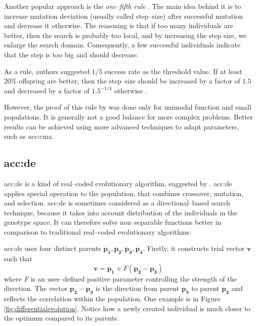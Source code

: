 Another popular approach is the \emph{one--fifth rule} \citep{onefifthrule}. The main idea behind it is to increase mutation deviation (usually called step--size) after successful mutation and decrease it otherwise. The reasoning is that if too many individuals are better, then the search is probably too local, and by increasing the step size, we enlarge the search domain. Consequently, a few successful individuals indicate that the step is too big and should decrease.

As a rule, authors \citet*{onefifthruleoriginal} suggested $1/5$ success rate as the threshold value. If at least $20\%$ offspring are better, then the step--size should be increased by a factor of $1.5$ and decreased by a factor of $1.5^{-1/4}$ otherwise \citep{onefifthrule}.

However, the proof of this rule by \citeauthor*{onefifthruleoriginal} was done only for unimodal function and small populations. It is generally not a good balance for more complex problems. Better results can be achieved using more advanced techniques to adapt parameters, such as \acrshort{acc:cma}.

\subsection{\texorpdfstring{\acrlong*{acc:de}}{Differential Evolution}}

\acrfull{acc:de} is a kind of real--coded evolutionary algorithm, suggested by \citet*{differentialevolutionoriginal}. \acrshort{acc:de} applies special operation to the population, that combines crossover, mutation, and selection. \acrshort{acc:de} is sometimes considered as a directional--based search technique, because it takes into account distribution of the individuals in the genotype space. It can therefore solve non--separable func\-tions better in comparison to traditional real--coded evolutionary algorithms.

\acrshort{acc:de} uses four distinct parents $\mathbf{p_1}, \mathbf{p_2}, \mathbf{p_3}, \mathbf{p_4}$. Firstly, it constructs trial vector $\mathbf{v}$ such that
$$
\mathbf{v} = \mathbf{p_1} + F\left( \mathbf{p_2} - \mathbf{p_3} \right)
$$
where $F$ is an user--defined positive parameter controlling the strength of the direction. The vector $\mathbf{p_2} - \mathbf{p_3}$ is the direction from parent $\mathbf{p_3}$ to parent $\mathbf{p_2}$ and reflects the correlation within the population. One example is in Figure \ref{fig:differentialevolution}. Notice how a newly created individual is much closer to the optimum compared to its parents.

